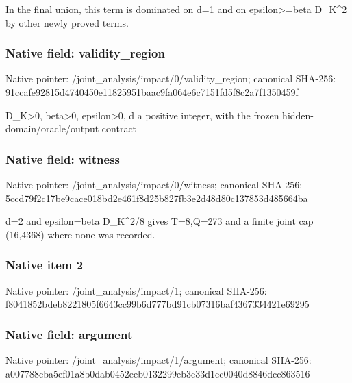 \documentclass[10pt,a4paper]{article}
\begin{document}
\begingroup\raggedright\sloppy In the final union,\allowbreak{} this term is dominated on d=\allowbreak{}1 and on epsilon>=\allowbreak{}beta D\_\allowbreak{}K\textasciicircum{}2 by other newly proved terms.\par\endgroup

\subsubsection{Native field: validity\_\allowbreak{}region}
Native pointer: /joint\_\allowbreak{}analysis/impact/0/validity\_\allowbreak{}region; canonical SHA-256: 91ccafe92815d4740450e11825951baac9fa064e6c7151fd5f8c2a7f1350459f

\begingroup\raggedright\sloppy D\_\allowbreak{}K>0,\allowbreak{} beta>0,\allowbreak{} epsilon>0,\allowbreak{} d a positive integer,\allowbreak{} with the frozen hidden-domain/\allowbreak{}oracle/\allowbreak{}output contract\par\endgroup

\subsubsection{Native field: witness}
Native pointer: /joint\_\allowbreak{}analysis/impact/0/witness; canonical SHA-256: 5ccd79f2c17be9cace018bd2e461f8d25b827fb3e2d48d80c137853d485664ba

\begingroup\raggedright\sloppy d=\allowbreak{}2 and epsilon=\allowbreak{}beta D\_\allowbreak{}K\textasciicircum{}2/\allowbreak{}8 gives T=\allowbreak{}8,\allowbreak{}Q=\allowbreak{}273 and a finite joint cap (16,\allowbreak{}4368) where none was recorded.\par\endgroup

\subsubsection{Native item 2}
Native pointer: /joint\_\allowbreak{}analysis/impact/1; canonical SHA-256: f8041852bdeb8221805f6643cc99b6d777bd91cb07316baf4367334421e69295

\subsubsection{Native field: argument}
Native pointer: /joint\_\allowbreak{}analysis/impact/1/argument; canonical SHA-256: a007788cba5ef01a8b0dab0452eeb0132299eb3e33d1ec0040d8846dcc863516
\end{document}
